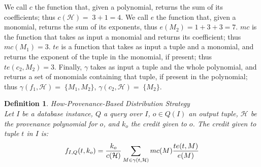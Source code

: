\documentclass[preprint,12pt,sort&compress]{elsarticle}
\newcommand{\rone}[1]{\textcolor{reviewer1}{#1}}
\newtheorem{definition}{Definition}[section]
\newcommand{\eat}[1]{}
\newcommand{\scream}[1]{{\bf * #1 *}{\typeout{#1}}}
\begin{document}
We call $c$ the function that, given a polynomial, returns the sum of its coefficients; thus $c(\mathcal{H})=\;3+1=4$. 
\rone{We call $e$ the function that, given a monomial, returns the sum of its exponents, thus $e(M_2)=1+3+3=7$.}
$mc$ is the function that takes as input a monomial and returns its coefficient; thus $mc(M_1) = 3$. 
$te$ is a function that takes as input a tuple and a monomial, and returns the exponent of the tuple in the monomial, if present; thus $te(c_2, M_2)=3$. 
Finally, $\gamma$ takes as input a tuple and the whole polynomial, and returns a set of monomials containing that tuple, if present in the polynomial; thus $\gamma(f_1, \mathcal{H})=\;\{M_1, M_2\}$, $\gamma(c_2, \mathcal{H})=\;\{M_2\}$. 

\eat{
More formally, consider the provenance polynomial $\mathcal{H} = H(Q, I, o)$ of a tuple $o$. We define: 
\begin{enumerate}
	\item $c(\mathcal{H}) = n$ the function $c: \mathbb{N}[TupleLoc] \mapsto \mathbb{N}$ that, given a polynomial, returns the sum of its coefficients;
	\item $c(M)$ the function $c: \mathcal{M} \mapsto \mathbb{N}$ that, given a monomial $M$, returns the sum of its exponents (with $\mathcal{M} \subset \mathbb{N}[TupleLoc]$ such that $\mathcal{M}$  is made only by the monomials $M$ in $\mathbb{N}[TupleLoc]$); 
	\item $e(t, M)$ the function $e: TupleLoc \times \mathcal{M} \mapsto \mathbb{N}$ that, given in input a tagged tuple and a monomial, returns the exponent of that tuple inside the monomial;
	\item $mc(M)$ the function $mc: \mathcal{M} \mapsto \mathbb{N}$ that, given in input one monomial, returns its coefficient;
	\item $\gamma(t, \mathcal{H})$ the function $\gamma: TupleLoc \times \mathbb{N}[TupleLoc] \mapsto \mathcal{M}$ that, given a tuple $t$ and a provenance polyomial $\mathcal{H}$, returns the (possibly empty) set of monomials $M$ in $\mathcal{H}$ such that $t$ appears in $M$.
\end{enumerate}
}
\begin{definition}{How-Provenance-Based Distribution Strategy}
    \label{def:how_distribution}\\
    Let $I$ be a database instance, $Q$ a query over $I$, $o \in Q(I)$ an output tuple, $\mathcal{H}$ be the provenance polynomial for $o$, and $k_o$ the credit given to $o$.
    The credit given to tuple $t$ in $I$ is:
    \[
    f_{I, Q}(t, k_o) = \frac{k_o}{c(\mathcal{H})} \sum_{M \in \gamma(t, \mathcal{H})} mc(M) \frac{\rone{te(t, M)}}{\rone{e(M)}}
    \]
\end{definition}
\end{document}
